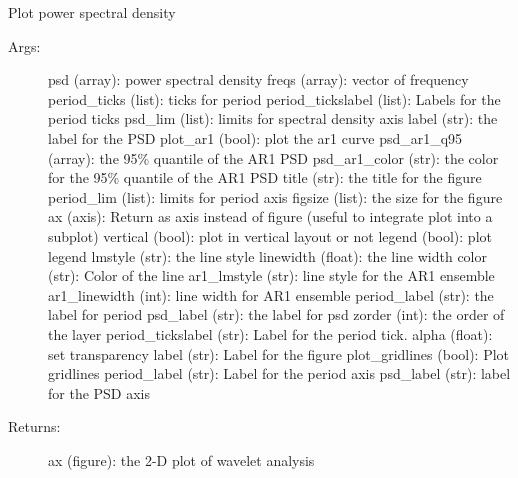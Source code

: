 \documentclass[letterpaper,10pt,english]{sphinxmanual}
\begin{document}
\begin{fulllineitems}
\label{\detokenize{Spectral:pyleoclim.Spectral.plot_psd}}
Plot power spectral density
\begin{description}
\item[{Args:}] \leavevmode
psd (array): power spectral density
freqs (array): vector of frequency
period\_ticks (list): ticks for period
period\_tickslabel (list): Labels for the period ticks
psd\_lim (list): limits for spectral density axis
label (str): the label for the PSD
plot\_ar1 (bool): plot the ar1 curve
psd\_ar1\_q95 (array): the 95\% quantile of the AR1 PSD
psd\_ar1\_color (str): the color for the 95\% quantile of the AR1 PSD
title (str): the title for the figure
period\_lim (list): limits for period axis
figsize (list): the size for the figure
ax (axis): Return as axis instead of figure (useful to integrate plot into a subplot)
vertical (bool): plot in vertical layout or not
legend (bool): plot legend
lmstyle (str): the line style
linewidth (float): the line width
color (str): Color of the line
ar1\_lmstyle (str): line style for the AR1 ensemble
ar1\_linewidth (int): line width for AR1 ensemble
period\_label (str): the label for period
psd\_label (str): the label for psd
zorder (int): the order of the layer
period\_tickslabel (str): Label for the period tick. 
alpha (float): set transparency
label (str): Label for the figure
plot\_gridlines (bool): Plot gridlines
period\_label (str): Label for the period axis
psd\_label (str): label for the PSD axis

\item[{Returns:}] \leavevmode
ax (figure): the 2-D plot of wavelet analysis

\end{description}

\end{fulllineitems}

\end{document}
